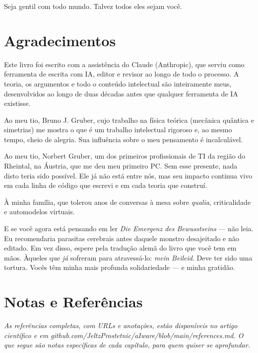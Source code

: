 \documentclass[11pt, twoside, openright]{book}
\begin{document}
Seja gentil com todo mundo. Talvez todos eles sejam você.


\chapter*{Agradecimentos}

Este livro foi escrito com a assistência do Claude (Anthropic), que serviu como ferramenta de escrita com IA, editor e revisor ao longo de todo o processo. A teoria, os argumentos e todo o conteúdo intelectual são inteiramente meus, desenvolvidos ao longo de duas décadas antes que qualquer ferramenta de IA existisse.

Ao meu tio, Bruno J. Gruber, cujo trabalho na física teórica (mecânica quântica e simetrias) me mostra o que é um trabalho intelectual rigoroso e, ao mesmo tempo, cheio de alegria. Sua influência sobre o meu pensamento é incalculável.

Ao meu tio, Norbert Gruber, um dos primeiros profissionais de TI da região do Rheintal, na Áustria, que me deu meu primeiro PC. Sem esse presente, nada disto teria sido possível. Ele já não está entre nós, mas seu impacto continua vivo em cada linha de código que escrevi e em cada teoria que construí.

À minha família, que tolerou anos de conversas à mesa sobre \textit{qualia}, criticalidade e automodelos virtuais.

E se você agora está pensando em ler \textit{Die Emergenz des Bewusstseins} --- não leia. Eu recomendaria parasitas cerebrais antes daquele monstro desajeitado e não editado. Em vez disso, espere pela tradução alemã do livro que você tem em mãos. Àqueles que \textit{já} sofreram para atravessá-lo: \textit{mein Beileid}. Deve ter sido uma tortura. Vocês têm minha mais profunda solidariedade --- e minha gratidão.


\chapter*{Notas e Referências}

\textit{As referências completas, com URLs e anotações, estão disponíveis no artigo científico e em github.com/\allowbreak{}JeltzProstetnic/\allowbreak{}aIware/\allowbreak{}blob/\allowbreak{}main/\allowbreak{}references.md. O que segue são notas específicas de cada capítulo, para quem quiser se aprofundar.}
\end{document}

